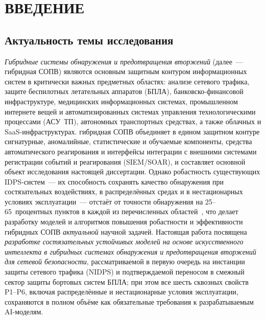 
\chapter*{ВВЕДЕНИЕ}

\section*{Актуальность темы исследования}

\emph{Гибридные системы обнаружения и предотвращения вторжений}
(далее~--- гибридная СОПВ) являются основным защитным контуром
информационных систем в критически важных предметных областях:
анализе сетевого трафика, защите беспилотных летательных аппаратов
(БПЛА), банковско-финансовой инфраструктуре, медицинских
информационных системах, промышленном интернете вещей и
автоматизированных системах управления технологическими процессами
(АСУ~ТП), автономных транспортных средствах, а также облачных и
SaaS-инфраструктурах. гибридная СОПВ объединяет в едином защитном
контуре сигнатурные, аномалийные, статистические и обучаемые
компоненты, средства автоматического реагирования и интерфейсы
интеграции с внешними системами регистрации событий и реагирования
(SIEM/SOAR), и составляет основной объект исследования настоящей
диссертации. Однако робастность существующих IDPS-систем~--- их
способность сохранять качество обнаружения при состязательных
воздействиях, в распределённых средах и в нестационарных условиях
эксплуатации~--- отстаёт от точности обнаружения на
25--65~процентных пунктов в каждой из перечисленных
областей~\cite{Zuegner2018,Bojchevski2019,Dai2018,Goodfellow2014gan,Szegedy2014},
что делает разработку моделей и алгоритмов повышения робастности и
эффективности гибридных СОПВ \emph{актуальной} научной задачей.
Настоящая работа посвящена \emph{разработке состязательных
устойчивых моделей на основе искусственного интеллекта в
гибридных системах обнаружения и предотвращения вторжений
для сетевой безопасности}, рассматриваемой в первую очередь
на инстанции защиты сетевого трафика (NIDPS) и подтверждаемой
переносом в смежный сектор защиты бортовых систем БПЛА; при
этом все шесть сквозных свойств P1--P6, включая распределённые
и нестационарные условия эксплуатации, сохраняются в полном
объёме как обязательные требования к разрабатываемым AI-моделям.

